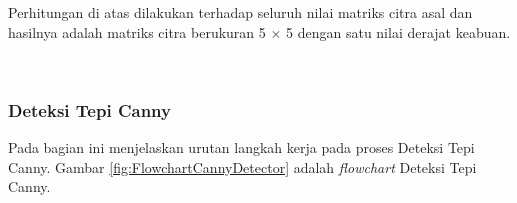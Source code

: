 \noindent Perhitungan di atas dilakukan terhadap seluruh nilai matriks citra asal dan hasilnya adalah matriks citra berukuran 5 $\times$ 5 dengan satu nilai derajat keabuan.

\begin{adjustbox}{width=1\textwidth}
	\noindent\begin{minipage}{\linewidth}
		\label{fig:MatriksCitraGrayscale}
	\end{minipage}
\end{adjustbox} \\

\subsubsection{Deteksi Tepi Canny}
\noindent Pada bagian ini menjelaskan urutan langkah kerja pada proses Deteksi Tepi Canny. Gambar \ref{fig:FlowchartCannyDetector} adalah \textit{flowchart} Deteksi Tepi Canny.

\begin{adjustbox}{width=1\textwidth}
	\noindent\begin{minipage}{\linewidth}
		\label{fig:FlowchartCannyDetector}
	\end{minipage}
\end{adjustbox}\\

